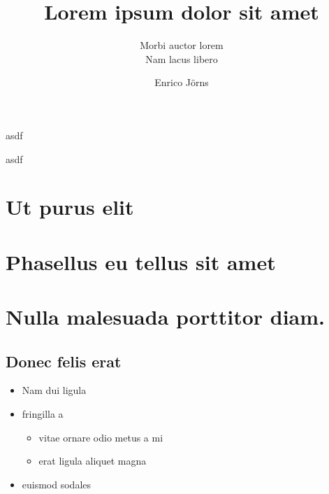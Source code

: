 \documentclass[a4paper,extramargin,violet]{tubsartcl}
\title{Lorem ipsum dolor sit amet}
\subtitle{Morbi auctor lorem\vphantom{g}\\ %
Nam lacus libero}
\author{Enrico Jörns}
\begin{document}
\maketitle[image,logo=outside]
\makebackpage
\pagestyle{scrheadings}
\tableofcontents

\begin{gausspage}
  \showtubslogo[right]
  \showdesignhelper
  \begin{segment}[bgcolor=tuSecondaryLight]{2}
    asdf
  \end{segment}
\end{gausspage}

\begin{gausspage}
  \showtubslogo[right]
  \showdesignhelper
  \begin{segment}[bgcolor=tuSecondaryLight]{2}
    asdf
  \end{segment}
\end{gausspage}

\section{Ut purus elit}

\lipsum[1]

% 

\section{Phasellus eu tellus sit amet}

\lipsum[2-5]

\section{Nulla malesuada porttitor diam.}

\lipsum[1-3]

\subsection{Donec felis erat}

\lipsum[4-7]

\begin{itemize}
  \item Nam dui ligula
  \item fringilla a
    \begin{itemize}
      \item vitae ornare odio metus a mi
      \item erat ligula aliquet magna
    \end{itemize}
  \item euismod sodales
\end{itemize}
\end{document}
